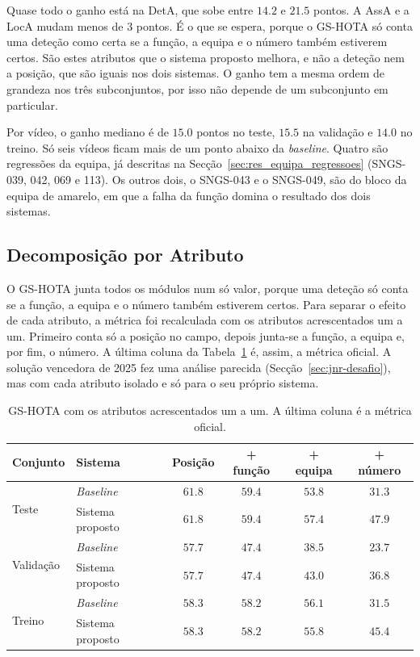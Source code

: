 Quase todo o ganho está na DetA, que sobe entre $14.2$ e $21.5$ pontos. A AssA e a LocA mudam menos de $3$ pontos. É o que se espera, porque o GS-HOTA só conta uma deteção como certa se a função, a equipa e o número também estiverem certos. São estes atributos que o sistema proposto melhora, e não a deteção nem a posição, que são iguais nos dois sistemas. O ganho tem a mesma ordem de grandeza nos três subconjuntos, por isso não depende de um subconjunto em particular.

Por vídeo, o ganho mediano é de $15.0$ pontos no teste, $15.5$ na validação e $14.0$ no treino. Só seis vídeos ficam mais de um ponto abaixo da \emph{baseline}. Quatro são regressões da equipa, já descritas na Secção~\ref{sec:res_equipa_regressoes} (SNGS-039, 042, 069 e 113). Os outros dois, o SNGS-043 e o SNGS-049, são do bloco da equipa de amarelo, em que a falha da função domina o resultado dos dois sistemas.

\subsection{Decomposição por Atributo}\label{sec:res_decomposicao}

O GS-HOTA junta todos os módulos num só valor, porque uma deteção só conta se a função, a equipa e o número também estiverem certos. Para separar o efeito de cada atributo, a métrica foi recalculada com os atributos acrescentados um a um. Primeiro conta só a posição no campo, depois junta-se a função, a equipa e, por fim, o número. A última coluna da Tabela~\ref{tab:decomposicao} é, assim, a métrica oficial. A solução vencedora de 2025 fez uma análise parecida (Secção~\ref{sec:jnr-desafio}), mas com cada atributo isolado e só para o seu próprio sistema.

\begin{table}[htbp]
    \centering
    \caption{GS-HOTA com os atributos acrescentados um a um. A última coluna é a métrica oficial.}
    \label{tab:decomposicao}
    \begin{tabular}{|l|l|c|c|c|c|}
        \hline
        \textbf{Conjunto} & \textbf{Sistema} & \textbf{Posição} & \textbf{+ função} & \textbf{+ equipa} & \textbf{+ número} \\
        \hline
        \multirow{2}{*}{Teste}     & \emph{Baseline}  & $61.8$ & $59.4$ & $53.8$ & $31.3$ \\
        \cline{2-6}
                                   & Sistema proposto & $61.8$ & $59.4$ & $57.4$ & $47.9$ \\
        \hline
        \multirow{2}{*}{Validação} & \emph{Baseline}  & $57.7$ & $47.4$ & $38.5$ & $23.7$ \\
        \cline{2-6}
                                   & Sistema proposto & $57.7$ & $47.4$ & $43.0$ & $36.8$ \\
        \hline
        \multirow{2}{*}{Treino}    & \emph{Baseline}  & $58.3$ & $58.2$ & $56.1$ & $31.5$ \\
        \cline{2-6}
                                   & Sistema proposto & $58.3$ & $58.2$ & $55.8$ & $45.4$ \\
        \hline
    \end{tabular}
\end{table}

